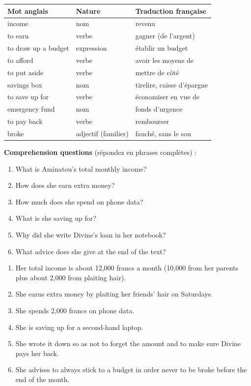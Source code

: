 \documentclass[11pt]{article}
\begin{document}
\begin{center}
\begin{tabularx}{\linewidth}{|l|l|X|}
\hline
\rowcolor{popblueL} Mot anglais & Nature & Traduction française \\
\hline
income & nom & revenu \\
\hline
to earn & verbe & gagner (de l'argent) \\
\hline
to draw up a budget & expression & établir un budget \\
\hline
to afford & verbe & avoir les moyens de \\
\hline
to put aside & verbe & mettre de côté \\
\hline
savings box & nom & tirelire, caisse d'épargne \\
\hline
to save up for & verbe & économiser en vue de \\
\hline
emergency fund & nom & fonds d'urgence \\
\hline
to pay back & verbe & rembourser \\
\hline
broke & adjectif (familier) & fauché, sans le sou \\
\hline
\end{tabularx}
\end{center}

\textbf{Comprehension questions} (répondez en phrases complètes) :

\begin{enumerate}
\item What is Aminatou's total monthly income?
\item How does she earn extra money?
\item How much does she spend on phone data?
\item What is she saving up for?
\item Why did she write Divine's loan in her notebook?
\item What advice does she give at the end of the text?
\end{enumerate}

\begin{corrige}
\begin{enumerate}
\item Her total income is about 12,000 francs a month (10,000 from her parents plus about 2,000 from plaiting hair).
\item She earns extra money by plaiting her friends' hair on Saturdays.
\item She spends 2,000 francs on phone data.
\item She is saving up for a second-hand laptop.
\item She wrote it down so as not to forget the amount and to make sure Divine pays her back.
\item She advises to always stick to a budget in order never to be broke before the end of the month.
\end{enumerate}
\end{corrige}
\end{document}
